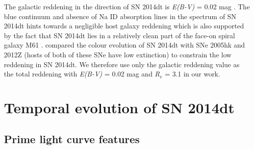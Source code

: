 \documentclass[fleqn,usenatbib]{mnras}
\begin{document}
The galactic reddening in the direction of SN 2014dt is {\it E(B-V)} = 0.02 mag \citep{2011ApJ...737..103S}. The blue continuum and absence of Na ID absorption lines in the spectrum of SN 2014dt hints towards a negligible host galaxy reddening which is also supported by the fact that SN 2014dt lies in a relatively clean part of the face-on spiral galaxy M61 \citep{2015ApJ...798L..37F}. \cite{2016ApJ...816L..13F} compared the colour evolution of SN 2014dt with SNe 2005hk and 2012Z (hosts of both of these SNe have low extinction) to constrain the low reddening in SN 2014dt. We therefore use only the galactic reddening value as the total reddening with {\it E(B-V)} = 0.02 mag and {\it R$_{v}$} = 3.1 in our work.         

\section{Temporal evolution of SN 2014dt}
\subsection{Prime light curve features}
\end{document}
